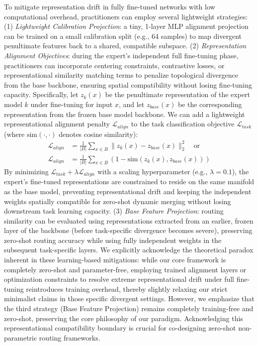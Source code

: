 To mitigate representation drift in fully fine-tuned networks with low computational overhead, practitioners can employ several lightweight strategies: (1) \emph{Lightweight Calibration Projection}: a tiny, 1-layer MLP alignment projection can be trained on a small calibration split (e.g., 64 samples) to map divergent penultimate features back to a shared, compatible subspace. (2) \emph{Representation Alignment Objectives}: during the expert's independent full fine-tuning phase, practitioners can incorporate centering constraints, contrastive losses, or representational similarity matching terms to penalize topological divergence from the base backbone, ensuring spatial compatibility without losing fine-tuning capacity. Specifically, let $z_k(x)$ be the penultimate representation of the expert model $k$ under fine-tuning for input $x$, and let $z_{base}(x)$ be the corresponding representation from the frozen base model backbone. We can add a lightweight representational alignment penalty $\mathcal{L}_{align}$ to the task classification objective $\mathcal{L}_{task}$ (where $\text{sim}(\cdot, \cdot)$ denotes cosine similarity):
\begin{equation}
\begin{aligned}
\mathcal{L}_{align} &= \frac{1}{|B|} \sum_{x \in B} \|z_k(x) - z_{base}(x)\|_2^2 \quad \text{or} \\
\mathcal{L}_{align} &= \frac{1}{|B|} \sum_{x \in B} \left(1 - \text{sim}\left(z_k(x), z_{base}(x)\right)\right)
\end{aligned}
\label{eq:align_objective}
\end{equation}
By minimizing $\mathcal{L}_{task} + \lambda \mathcal{L}_{align}$ with a scaling hyperparameter (e.g., $\lambda = 0.1$), the expert's fine-tuned representations are constrained to reside on the same manifold as the base model, preventing representational drift and keeping the independent weights spatially compatible for zero-shot dynamic merging without losing downstream task learning capacity. (3) \emph{Base Feature Projection}: routing similarity can be evaluated using representations extracted from an earlier, frozen layer of the backbone (before task-specific divergence becomes severe), preserving zero-shot routing accuracy while using fully independent weights in the subsequent task-specific layers. We explicitly acknowledge the theoretical paradox inherent in these learning-based mitigations: while our core framework is completely zero-shot and parameter-free, employing trained alignment layers or optimization constraints to resolve extreme representational drift under full fine-tuning reintroduces training overhead, thereby slightly relaxing our strict minimalist claims in those specific divergent settings. However, we emphasize that the third strategy (Base Feature Projection) remains completely training-free and zero-shot, preserving the core philosophy of our paradigm. Acknowledging this representational compatibility boundary is crucial for co-designing zero-shot non-parametric routing frameworks.


